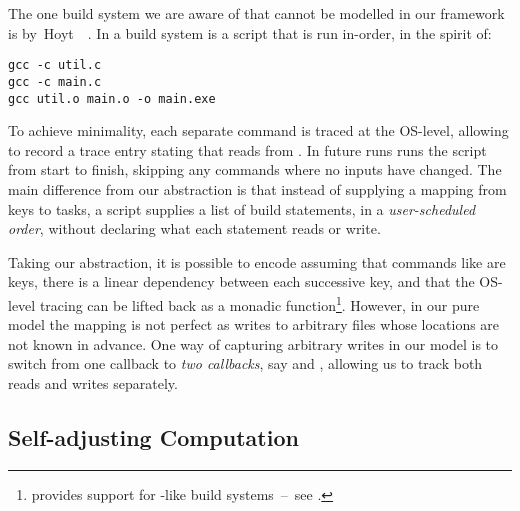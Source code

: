 The one build system we are aware of that cannot be modelled in our framework is
\Fabricate by~Hoyt~\etal~. In \Fabricate a build system is
a script that is run in-order, in the spirit of:

\vspace{1mm}
\begin{verbatim}
gcc -c util.c
gcc -c main.c
gcc util.o main.o -o main.exe
\end{verbatim}
\vspace{1mm}

\noindent
To achieve minimality, each separate command is traced at the OS-level, allowing
\Fabricate to record a trace entry stating that  reads from
. In future runs \Fabricate runs the script from start to finish,
skipping any commands where no inputs have changed. The main difference from our
 abstraction is that instead of supplying a mapping from keys to
tasks, a \Fabricate script supplies a list of build statements, in a
\emph{user-scheduled order}, without declaring what each statement reads or write.

Taking our abstraction, it is possible to encode \Fabricate assuming that
commands like  are keys, there is a linear dependency between
each successive key, and that the OS-level tracing can be lifted back as a
monadic  function\footnote{\Shake provides support for
\Fabricate{}-like build systems~--~see .}.
However, in our pure model the mapping is not perfect as  writes to
arbitrary files whose locations are not known in advance. One way of capturing
arbitrary writes in our model is to switch from one callback  to
\emph{two callbacks}, say  and , allowing us to track both
reads and writes separately.

\subsection{Self-adjusting Computation}

